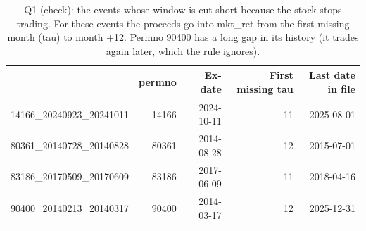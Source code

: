 \begin{table}[!htbp]
\centering
\small
\caption{Q1 (check): the events whose window is cut short because the stock stops trading. For these events the proceeds go into mkt\_ret from the first missing month (tau) to month +12. Permno 90400 has a long gap in its history (it trades again later, which the rule ignores).}
\label{tab:q1b}
\begin{tabular}{lrrrr}
\toprule
 & permno & Ex-date & First missing tau & Last date in file \\
\midrule
14166\_20240923\_20241011 & 14166 & 2024-10-11 & 11 & 2025-08-01 \\
80361\_20140728\_20140828 & 80361 & 2014-08-28 & 12 & 2015-07-01 \\
83186\_20170509\_20170609 & 83186 & 2017-06-09 & 11 & 2018-04-16 \\
90400\_20140213\_20140317 & 90400 & 2014-03-17 & 12 & 2025-12-31 \\
\bottomrule
\end{tabular}
\end{table}

